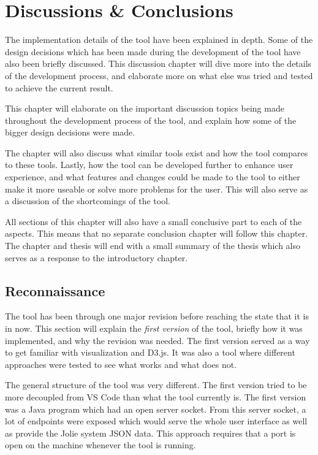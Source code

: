 \chapter{Discussions \& Conclusions}
The implementation details of the tool have been explained in depth. Some of the design decisions which has been made during the development of the tool have also been briefly discussed.
This discussion chapter will dive more into the details of the development process, and elaborate more on what else was tried and tested to achieve the current result.

This chapter will elaborate on the important discussion topics being made throughout the development process of the tool, and explain how
some of the bigger design decisions were made.

The chapter will also discuss what similar tools exist and how the tool compares to these tools. Lastly, how the tool can be developed further to enhance user experience, and what features and changes could be made to the tool to either make it more useable
or solve more problems for the user. This will also serve as a discussion of the shortcomings of the tool.

All sections of this chapter will also have a small conclusive part to each of the aspects. This means that no separate conclusion chapter will follow this chapter. 
The chapter and thesis will end with a small summary of the thesis which also serves as a response to the introductory chapter.

\section{Reconnaissance}
The tool has been through one major revision before reaching the state that it is in now. This section
will explain the \emph{first version} of the tool, briefly how it was implemented, and why the revision was needed.
The first version served as a way to get familiar with visualization and D3.js. It was also a tool where different approaches were tested to see what works and what does not.

The general structure of the tool was very different. The first version tried to be more decoupled from VS Code than what the tool currently is.
The first version was a Java program which had an open server socket. From this server socket, a lot of endpoints were exposed which would serve the whole user interface as well as provide the Jolie system JSON data.
This approach requires that a port is open on the machine whenever the tool is running.

